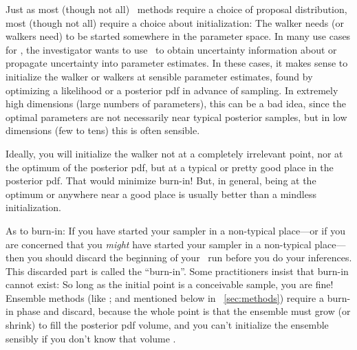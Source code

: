 \documentclass[modern]{aastex61}
\newcommand{\MCMC}{\acronym{MCMC}}
\begin{document}
Just as most (though not all) \MCMC\ methods require a choice of
proposal distribution, most (though not all) require a choice about
initialization:
The walker needs (or walkers need) to be started somewhere in the
parameter space.
In many use cases for \MCMC, the investigator wants to use \MCMC\ to obtain
uncertainty information about or propagate uncertainty into parameter
estimates.
In these cases, it makes sense to initialize the walker or walkers at
sensible parameter estimates, found by optimizing a likelihood or a
posterior pdf in advance of sampling.
In extremely high dimensions (large numbers of parameters), this can
be a bad idea, since the optimal parameters are not necessarily near
typical posterior samples, but
in low dimensions (few to tens) this is often sensible.

Ideally, you will initialize the walker not at a completely irrelevant
point, nor at the optimum of the posterior pdf, but at a typical or
pretty good place in the posterior pdf.
That would minimize burn-in!
But, in general, being at the optimum or anywhere near a good place is
usually better than a mindless initialization.

As to burn-in:
If you have started your sampler in a non-typical place---or if you
are concerned that you \emph{might} have started your sampler in a
non-typical place---then you should discard the beginning of your
\MCMC\ run before you do your inferences.
This discarded part is called the ``burn-in''.
Some practitioners insist that burn-in cannot exist: So long as the initial point is a conceivable
sample, you are fine!
Ensemble methods (like ; and
mentioned below in \sectionname~\ref{sec:methods}) require a burn-in
phase and discard, because the whole point is that the ensemble must
grow (or shrink) to fill the posterior pdf volume, and you can't
initialize the ensemble sensibly if you don't know that volume
.
\end{document}
